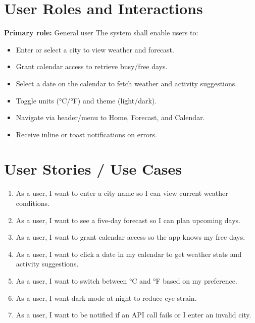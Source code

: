 \documentclass[12pt,a4paper]{article}
\begin{document}
\section{User Roles and Interactions}
\textbf{Primary role:} General user  
The system shall enable users to:
\begin{itemize}[nosep]
  \item Enter or select a city to view weather and forecast.
  \item Grant calendar access to retrieve busy/free days.
  \item Select a date on the calendar to fetch weather and activity suggestions.
  \item Toggle units (°C/°F) and theme (light/dark).
  \item Navigate via header/menu to Home, Forecast, and Calendar.
  \item Receive inline or toast notifications on errors.
\end{itemize}

\section{User Stories / Use Cases}
\begin{enumerate}[nosep]
  \item As a user, I want to enter a city name so I can view current weather conditions.
  \item As a user, I want to see a five-day forecast so I can plan upcoming days.
  \item As a user, I want to grant calendar access so the app knows my free days.
  \item As a user, I want to click a date in my calendar to get weather stats and activity suggestions.
  \item As a user, I want to switch between °C and °F based on my preference.
  \item As a user, I want dark mode at night to reduce eye strain.
  \item As a user, I want to be notified if an API call fails or I enter an invalid city.
\end{enumerate}

\newpage
\end{document}
